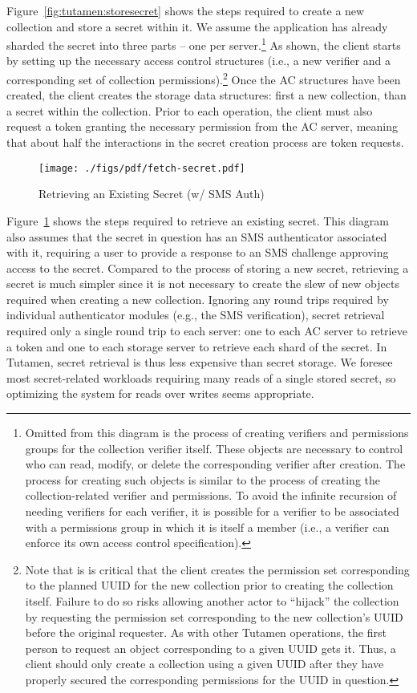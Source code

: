 Figure~\ref{fig:tutamen:storesecret} shows the steps required to
create a new collection and store a secret within it. We assume the
application has already sharded the secret into three parts -- one per
server.\footnote{Omitted from this diagram is the process of creating
  verifiers and permissions groups for the collection verifier
  itself. These objects are necessary to control who can read, modify,
  or delete the corresponding verifier after creation. The process for
  creating such objects is similar to the process of creating the
  collection-related verifier and permissions. To avoid the infinite
  recursion of needing verifiers for each verifier, it is possible for
  a verifier to be associated with a permissions group in which it is
  itself a member (i.e., a verifier can enforce its own access control
  specification).} As shown, the client starts by setting up the
necessary access control structures (i.e., a new verifier and a
corresponding set of collection permissions).\footnote{Note that is is
  critical that the client creates the permission set corresponding to
  the planned UUID for the new collection prior to creating the
  collection itself. Failure to do so risks allowing another actor to
  ``hijack'' the collection by requesting the permission set
  corresponding to the new collection's UUID before the original
  requester. As with other Tutamen operations, the first person to
  request an object corresponding to a given UUID gets it. Thus, a
  client should only create a collection using a given UUID after they
  have properly secured the corresponding permissions for the UUID in
  question.} Once the AC structures have been created, the client
creates the storage data structures: first a new collection, than a
secret within the collection. Prior to each operation, the client must
also request a token granting the necessary permission from the AC
server, meaning that about half the interactions in the secret
creation process are token requests.

\begin{figure}[th]
  \centering
  \texttt{[image: ./figs/pdf/fetch-secret.pdf]}
  \caption{Retrieving an Existing Secret (w/ SMS Auth)}
  \label{fig:tutamen:fetchsecret}
\end{figure}

Figure~\ref{fig:tutamen:fetchsecret} shows the steps required to
retrieve an existing secret. This diagram also assumes that the secret
in question has an SMS authenticator associated with it, requiring a
user to provide a response to an SMS challenge approving access to the
secret. Compared to the process of storing a new secret, retrieving a
secret is much simpler since it is not necessary to create the slew of
new objects required when creating a new collection. Ignoring any
round trips required by individual authenticator modules (e.g., the
SMS verification), secret retrieval required only a single round trip
to each server: one to each AC server to retrieve a token and one to
each storage server to retrieve each shard of the secret. In Tutamen,
secret retrieval is thus less expensive than secret storage. We
foresee most secret-related workloads requiring many reads of a single
stored secret, so optimizing the system for reads over writes seems
appropriate.

